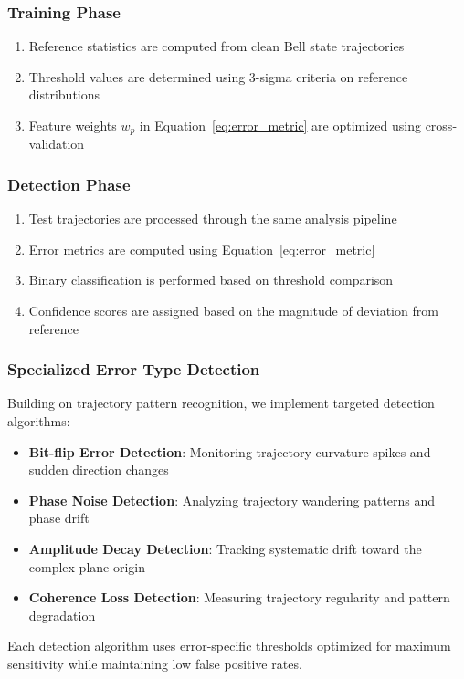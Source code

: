 \subsubsection{Training Phase}
\begin{enumerate}
\item Reference statistics are computed from clean Bell state trajectories
\item Threshold values are determined using 3-sigma criteria on reference distributions
\item Feature weights $w_p$ in Equation~\ref{eq:error_metric} are optimized using cross-validation
\end{enumerate}

\subsubsection{Detection Phase}
\begin{enumerate}
\item Test trajectories are processed through the same analysis pipeline
\item Error metrics are computed using Equation~\ref{eq:error_metric}
\item Binary classification is performed based on threshold comparison
\item Confidence scores are assigned based on the magnitude of deviation from reference
\end{enumerate}

\subsubsection{Specialized Error Type Detection}
Building on trajectory pattern recognition, we implement targeted detection algorithms:

\begin{itemize}
\item \textbf{Bit-flip Error Detection}: Monitoring trajectory curvature spikes and sudden direction changes
\item \textbf{Phase Noise Detection}: Analyzing trajectory wandering patterns and phase drift
\item \textbf{Amplitude Decay Detection}: Tracking systematic drift toward the complex plane origin
\item \textbf{Coherence Loss Detection}: Measuring trajectory regularity and pattern degradation
\end{itemize}

Each detection algorithm uses error-specific thresholds optimized for maximum sensitivity while maintaining low false positive rates.

